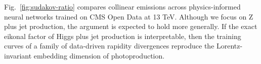 Fig.~\ref{fig:sudakov-ratio} compares collinear emissions across
physics-informed neural networks trained on CMS Open Data at 13 TeV.
Although we focus on Z plus jet production, the argument is expected to
hold more generally. If the exact eikonal factor of Higgs plus jet
production is interpretable, then the training curves of a family of
data-driven rapidity divergences reproduce the Lorentz-invariant
embedding dimension of photoproduction.


